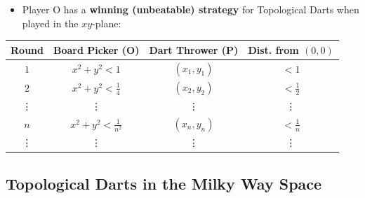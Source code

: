 \documentclass{beamer}
\begin{document}
\begin{frame}
  \begin{itemize}
  \item
    Player O has a \textbf{winning (unbeatable) strategy} for Topological Darts when played in the $xy$-plane:
  \end{itemize}
\begin{center}
\begin{tabular}{c|c|c|c}
Round & Board Picker (O) & Dart Thrower (P) & Dist. from $(0,0)$ \\\hline
$1$ & $x^2+y^2 < 1$ & $(x_1,y_1)$ & $< 1$ \\
$2$ & $x^2+y^2 < \frac{1}{4}$ & $(x_2,y_2)$ & $< \frac{1}{2}$ \\
\vdots & \vdots & \vdots & \vdots \\
$n$ & $x^2+y^2 < \frac{1}{n^2}$ & $(x_n,y_n)$ & $< \frac{1}{n}$ \\
\vdots & \vdots & \vdots & \vdots \\
\end{tabular}
\end{center}
\end{frame}

\subsection{Topological Darts in the Milky Way Space}
\end{document}
